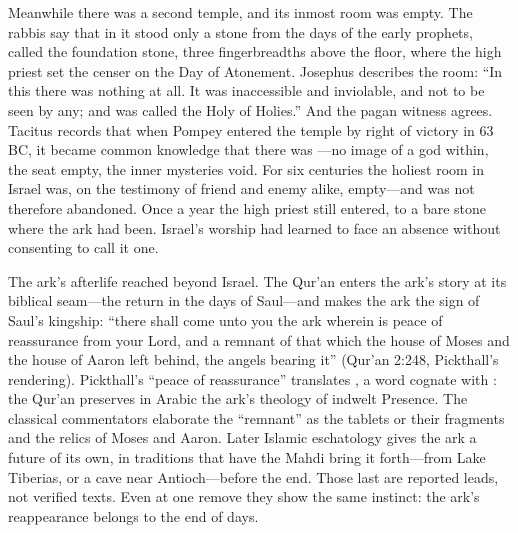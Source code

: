 Meanwhile there was a second temple, and its inmost room was empty. The
rabbis say that in it stood only a stone from the days of the early
prophets, called the foundation stone, three fingerbreadths above the
floor, where the high priest set the censer on the Day of Atonement.
Josephus describes the room: ``In this there was nothing at all. It was
inaccessible and inviolable, and not to be seen by any; and was called the
Holy of Holies.'' And the pagan witness agrees. Tacitus records that when
Pompey entered the temple by right of victory in 63 BC,
it became common knowledge that there was ---no image of a god within, the seat empty,
the inner mysteries void. For six centuries the holiest room in Israel was, on the testimony
of friend and enemy alike, empty---and was not therefore abandoned. Once a
year the high priest still entered, to a bare stone where the ark had been.
Israel's worship had learned to face an absence without consenting to call
it one.

The ark's afterlife reached beyond Israel. The Qur'an enters the ark's
story at its biblical seam---the return in the days of Saul---and makes the
ark the sign of Saul's kingship: ``there shall come unto you
the ark wherein is peace of reassurance from your Lord, and a remnant of
that which the house of Moses and the house of Aaron left behind, the
angels bearing it'' (Qur'an 2:248, Pickthall's rendering). Pickthall's
``peace of reassurance'' translates , a word cognate with
: the Qur'an preserves in Arabic the ark's theology of
indwelt Presence. The classical commentators elaborate the ``remnant'' as
the tablets or their fragments and the relics of Moses and Aaron. Later
Islamic eschatology gives the ark a future of its own, in traditions
that have the Mahdi bring it forth---from Lake Tiberias, or a cave near
Antioch---before the end. Those last are reported leads, not verified
texts. Even at one remove they show the same instinct: the ark's
reappearance belongs to the end of days.

